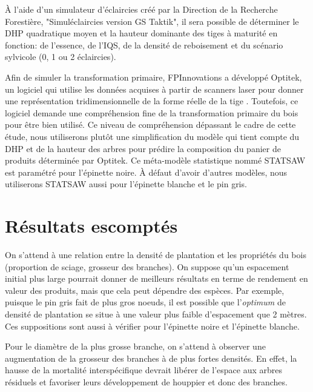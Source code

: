 \documentclass[letterpaper, 12pt]{article}
\begin{document}
\begin{onehalfspace}
À l’aide d’un simulateur d’éclaircies créé par la Direction de la Recherche Forestière, "Simuléclaircies version GS Taktik", il sera possible de déterminer le DHP quadratique moyen et la hauteur dominante des tiges à maturité en fonction: de l’essence, de l’IQS, de la densité de reboisement et du scénario sylvicole (0, 1 ou 2 éclaircies). 

\vspace{12pt}

Afin de simuler la transformation primaire, FPInnovations a développé Optitek, un logiciel qui utilise les données acquises à partir de scanners laser pour donner une représentation tridimensionnelle de la forme réelle de la tige \cite{FPInnovations2014}. Toutefois, ce logiciel demande une compréhension fine de la transformation primaire du bois pour être bien utilisé. Ce niveau de compréhension dépassant le cadre de cette étude, nous utiliserons plutôt une simplification du modèle qui tient compte du DHP et de la hauteur des arbres pour prédire la composition du panier de produits déterminée par Optitek. Ce méta-modèle statistique nommé STATSAW \cite{Auty2014} est paramétré pour l'épinette noire. À défaut d'avoir d'autres modèles, nous utiliserons STATSAW aussi pour l'épinette blanche et le pin gris.

\section{Résultats escomptés}

On s’attend à une relation entre la densité de plantation et les propriétés du bois (proportion de sciage, grosseur des branches). On suppose qu'un espacement initial plus large pourrait donner de meilleurs résultats en terme de rendement en valeur des produits, mais que cela peut dépendre des espèces. Par exemple, puisque le pin gris fait de plus gros noeuds, il est possible que l'\textit{optimum} de densité de plantation se situe à une valeur plus faible d'espacement que 2 mètres. Ces suppositions sont aussi à vérifier pour l'épinette noire et l'épinette blanche. 

\vspace{12pt}

Pour le diamètre de la plus grosse branche, on s'attend à observer une augmentation de la grosseur des branches à de plus fortes densités. En effet, la hausse de la mortalité interspécifique devrait libérer de l'espace aux arbres résiduels et favoriser leurs développement de houppier et donc des branches.


\end{onehalfspace}
\end{document}
